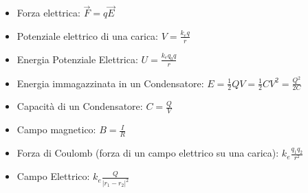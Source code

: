 \documentclass[14pt]{extarticle}
\begin{document}
\begin{itemize}
    \item Forza elettrica: $\overrightarrow{F}=q\overrightarrow{E}$
    \item Potenziale elettrico di una carica: $V=\frac{k_eq}{r}$
    \item Energia Potenziale Elettrica: $U=\frac{k_eq_0q}{r}$
\end{itemize}

\begin{itemize}
    \item Energia immagazzinata in un Condensatore: $E=\frac{1}{2}QV=\frac{1}{2}CV^2=\frac{Q^2}{2C}$
    \item Capacità di un Condensatore: $C=\frac{Q}{V}$
    \item Campo magnetico: $B=\frac{I}{R}$
\end{itemize}

\begin{itemize}
    \item Forza di Coulomb (forza di un campo elettrico su una carica): $k_e\frac{q_1q_2}{r^2}$
    \item Campo Elettrico: $k_e\frac{Q}{|r_1-r_2|^2}$
    
\end{itemize}
\end{document}
